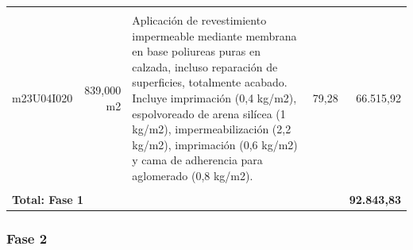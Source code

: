 \documentclass{book}%
\begin{document}
\begin{longtable}{lrlrr}
&&&&\\%
m23U04I020&   839,000 m2&\multicolumn{1}{p{5cm}}{Aplicación de revestimiento impermeable mediante membrana en base poliureas puras en calzada, incluso reparación de superficies, totalmente acabado. Incluye imprimación (0,4 kg/m2), espolvoreado de arena silícea (1 kg/m2), impermeabilización (2,2 kg/m2), imprimación (0,6 kg/m2) y cama de adherencia para aglomerado (0,8 kg/m2).}&     79,28&66.515,92\\%
&&&&\\%
\multicolumn{4}{p{8cm}}{\textbf{Total: Fase 1}}&\textbf{92.843,83}\\%
\end{longtable}%
\normalsize

%
\subsubsection{Fase 2}%
\small%
\end{document}

